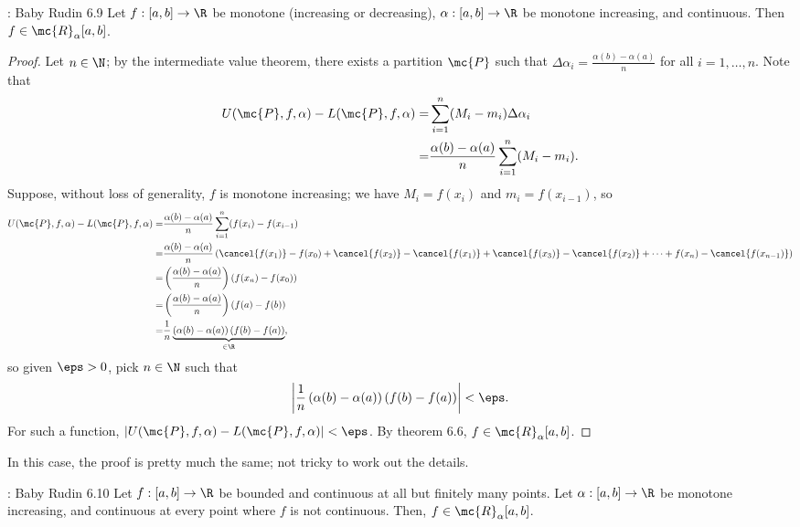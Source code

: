 \begin{ntheorem}{: Baby Rudin 6.9}
	Let \(f:[a,b]\to\R\) be monotone (increasing or decreasing), \(\alpha:[a,b]\to\R\) be monotone increasing, and continuous. Then \(f\in\mc{R}_{\alpha}[a,b]\).
\end{ntheorem}
\begin{proof}
	Let \(n\in\N\); by the intermediate value theorem, there exists a partition \(\mc{P}\) such that \(\Delta \alpha_i=\displaystyle\frac{\alpha(b)-\alpha(a)}{n}\) for all \(i=1,\dots,n\). Note that
	\begin{align*}
		U(\mc{P},f,\alpha)-L(\mc{P},f,\alpha)=&\sum_{i=1}^n(M_i-m_i)\Delta\alpha_i\\
											 =&\frac{\alpha(b)-\alpha(a)}{n}\sum_{i=1}^n(M_i-m_i).
	\end{align*}
	Suppose, without loss of generality, \(f\) is monotone increasing; we have \(M_i=f(x_i)\) and \(m_i=f(x_{i-1})\), so 
	\begin{align*}
		U(\mc{P},f,\alpha)-L(\mc{P},f,\alpha)=&\frac{\alpha(b)-\alpha(a)}{n}\sum_{i=1}^n(f(x_i)-f(x_{i-1})\\
		=&\frac{\alpha(b)-\alpha(a)}{n}\left(\cancel{f(x_1)}-f(x_0)+\cancel{f(x_2)}-\cancel{f(x_1)}+\cancel{f(x_3)}-\cancel{f(x_2)}+\dots+f(x_n)-\cancel{f(x_{n-1})}\right)\\
		=&\left(\frac{\alpha(b)-\alpha(a)}{n}\right)\left(f(x_n)-f(x_0)\right)\\
		=&\left(\frac{\alpha(b)-\alpha(a)}{n}\right)\left(f(a)-f(b)\right)\\
		=&\frac{1}{n}\underbrace{\left(\alpha(b)-\alpha(a)\right)\left(f(b)-f(a)\right)}_{\in\R},
	\end{align*}
	so given \(\eps>0\), pick \(n\in\N\) such that 
	\begin{equation*}
		\left|\frac{1}{n}\left(\alpha(b)-\alpha(a)\right)\left(f(b)-f(a)\right)\right|<\eps.
	\end{equation*}
	For such a function, \(|U(\mc{P},f,\alpha)-L(\mc{P},f,\alpha)|<\eps\). By theorem 6.6, \(f\in\mc{R}_{\alpha}[a,b]\).
\end{proof}
\begin{note}
	In this case, the proof is pretty much the same; not tricky to work out the details.
\end{note}

\begin{ntheorem}{: Baby Rudin 6.10}
	Let \(f:[a,b]\to\R\) be bounded and continuous at all but finitely many points. Let \(\alpha:[a,b]\to\R\) be monotone increasing, and continuous at every point where \(f\) is not continuous. Then, \(f\in\mc{R}_{\alpha}[a,b]\).
\end{ntheorem}